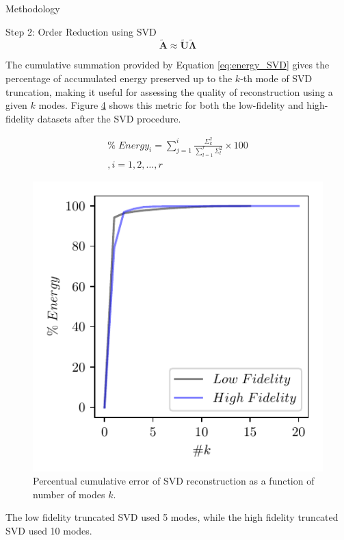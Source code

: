\begin{frame}{Methodology}
\begin{block}{Step 2: Order Reduction using SVD}
\[\tilde{\mathbf{A}} \approx  \tilde{\mathbf{U}} \tilde{\mathbf{\Lambda}}\]

The cumulative summation provided by Equation
\protect\hyperlink{eq:energy_SVD}{{[}eq:energy\_SVD{]}} gives the
percentage of accumulated energy preserved up to the \(k\)-th mode of
SVD truncation, making it useful for assessing the quality of
reconstruction using a given \(k\) modes. Figure
\protect\hyperlink{fig:svd_energy}{4} shows this metric for both the
low-fidelity and high-fidelity datasets after the SVD procedure.

\[\begin{split}
\%\; Energy_i= \sum_{j=1}^i \frac{\Sigma_k^2}{\sum_{l=1}^r \Sigma_l^2} \times 100 \\ , i = 1,2, \dots, r
\end{split}
\label{eq:energy_SVD}\]

\begin{figure}
\hypertarget{fig:svd_energy}{%
\centering
\includegraphics{figures/svd_energy.pdf}
\caption{Percentual cumulative error of SVD reconstruction as a function
of number of modes \(k\).}\label{fig:svd_energy}
}
\end{figure}

The low fidelity truncated SVD used 5 modes, while the high fidelity
truncated SVD used 10 modes.
\end{block}


\end{frame}
